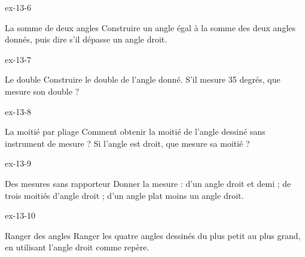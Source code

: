 \begin{blocLivre}{ex-13-6}\begin{exercice}[2]{La somme de deux angles}
Construire un angle égal à la somme des deux angles donnés, puis dire s’il dépasse un angle droit.
\label{fig-ex-13-6}
\end{exercice}\end{blocLivre}
\begin{blocLivre}{ex-13-7}\begin{exercice}[2]{Le double}
Construire le double de l’angle donné. S’il mesure 35 degrés, que mesure son double ?
\label{fig-ex-13-7}
\end{exercice}\end{blocLivre}
\begin{blocLivre}{ex-13-8}\begin{exercice}[2]{La moitié par pliage}
Comment obtenir la moitié de l’angle dessiné sans instrument de mesure ? Si l’angle est droit, que mesure sa moitié ?
\label{fig-ex-13-8}
\end{exercice}\end{blocLivre}
\begin{blocLivre}{ex-13-9}\begin{exercice}[2]{Des mesures sans rapporteur}
Donner la mesure : d’un angle droit et demi ; de trois moitiés d’angle droit ; d’un angle plat moins un angle droit.
\end{exercice}\end{blocLivre}
\begin{blocLivre}{ex-13-10}\begin{exercice}[2]{Ranger des angles}
Ranger les quatre angles dessinés du plus petit au plus grand, en utilisant l’angle droit comme repère.
\label{fig-ex-13-10}
\end{exercice}\end{blocLivre}

